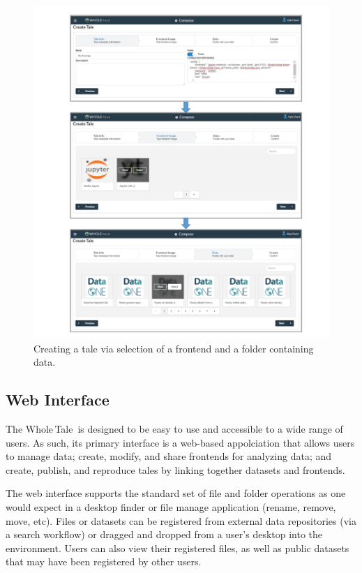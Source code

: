 \documentclass[review]{elsarticle}
\newcommand{\wt}{Whole\,Tale}
\begin{document}
\begin{figure}[ht!]
\centering
  \includegraphics[trim=0in 0in 0in 0in,clip,width=0.75\columnwidth]{tale-creation.pdf}
\caption{Creating a tale via selection of a frontend and a folder containing data. \label{fig:creation}}
\end{figure}


\subsection{Web Interface}

The \wt\ is designed to be easy to use and accessible
to a wide range of users. As such, its primary interface is
a web-based appolciation that allows users to manage data; create, modify, and share frontends for analyzing data; and 
create, publish, and reproduce tales by linking together datasets
and frontends. 

The web interface supports the standard set of file and folder operations  as one would expect in a desktop finder or file manage application (rename, remove, move, etc). 
Files or datasets can be registered
from external data repositories (via a search workflow) or dragged and dropped from a user's desktop into the environment. Users can also view their registered files, as well as public datasets that may have been registered by other users. 
 
\end{document}
